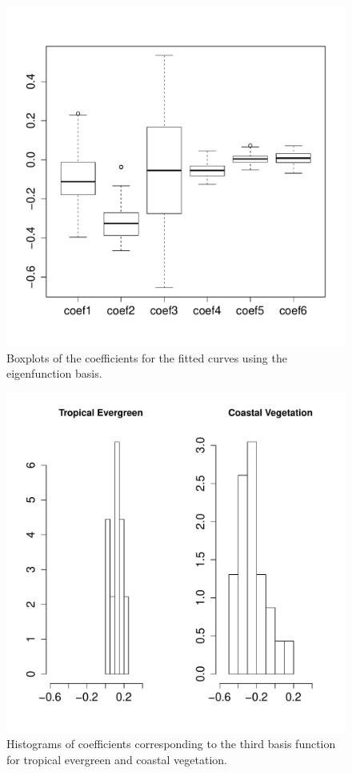 \begin{figure}
	[htbp] 
	
	\centering 
	\includegraphics[width=0.5 
	\textwidth]{Images-future-work/boxplot-coefs.pdf} \caption{Boxplots of the coefficients for the fitted curves using the eigenfunction basis. } \label{fig:coef boxplot} 
\end{figure}
\begin{figure}
	[htbp] 
	
	\centering 
	\includegraphics[width=0.5 
	\textwidth]{Images-future-work/hist-trpEvgrn-CstVeg-coef3.pdf} \caption{Histograms of coefficients corresponding to the third basis function for tropical evergreen and coastal vegetation. } \label{fig:histogram coefs} 
\end{figure}

